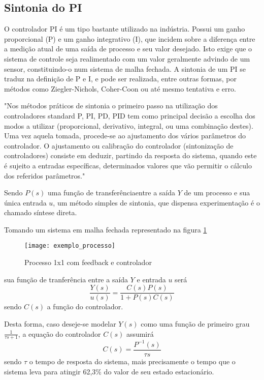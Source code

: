 \subsection{Sintonia do PI}

O controlador PI é um tipo bastante utilizado na indústria. Possui um ganho proporcional (P) e um ganho integrativo (I), que incidem sobre a diferença entre a medição atual de uma saída de processo e seu valor desejado. Isto exige que o sistema de controle seja realimentado com um valor geralmente advindo de um sensor, constituindo-o num sistema de malha fechada. A sintonia de um PI se traduz na definição de P e I, e pode ser realizada, entre outras formas, por métodos como Ziegler-Nichols, Coher-Coon ou até mesmo tentativa e erro.

\begin{displayquote}
	"Nos métodos práticos de sintonia o primeiro passo na utilização dos controladores standard P, PI, PD, PID tem como principal decisão a escolha dos modos a utilizar (proporcional, derivativo, integral, ou uma combinação destes). Uma vez aquela tomada, procede-se ao ajustamento dos vários parâmetros do controlador. O ajustamento ou calibração do controlador (sintonização de controladores) consiste em deduzir, partindo da resposta do sistema, quando este é sujeito a entradas específicas, determinados valores que vão permitir o cálculo dos referidos parâmetros." \cite{lourenco2007}
\end{displayquote}

Sendo $P(s)$ uma função de transferênciaentre a saída $Y$ de um processo e sua única entrada $u$, um método simples de sintonia, que dispensa experimentação é o chamado síntese direta.

Tomando um sistema em malha fechada representado na figura \ref{img_exemplo_processo}

\begin{figure}[hbt]
	\centering
	\texttt{[image: exemplo\_processo]}
	\caption{Processo 1x1 com feedback e controlador}
	\label{img_exemplo_processo}
\end{figure}

sua função de tranferência entre a saída $Y$ e entrada $u$ será
\begin{equation}
\frac{Y(s)}{u(s)} = \frac{C(s)P(s)}{1+P(s)C(s)}
\end{equation}
sendo $C(s)$ a função do controlador.

Desta forma, caso deseje-se modelar $Y(s)$ como uma função de primeiro grau $\frac{1}{\tau s + 1}$, a equação do controlador $C(s)$ assumirá
\begin{equation}
C(s) = \frac{P^{-1}(s)}{\tau s}
\end{equation}
sendo $\tau$ o tempo de resposta do sistema, mais precisamente o tempo que o sistema leva para atingir 62,3\% do valor de seu estado estacionário.

